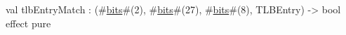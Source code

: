 val tlbEntryMatch : (#\hyperref[zbits]{bits}#(2), #\hyperref[zbits]{bits}#(27), #\hyperref[zbits]{bits}#(8), TLBEntry) -> bool effect pure
